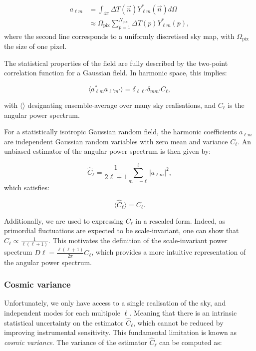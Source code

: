 \documentclass[../../thesis.tex]{subfiles}
\begin{document}
\begin{align}
    a_{\ell m} &= \int_{4\pi} \Delta T(\vec{n})Y_{\ell m}^{*}(\vec{n})d\Omega \\
    &\approx \Omega_{\mathrm{pix}} \sum_{p=1}^{N_{\mathrm{pix}}}\Delta T(p)Y_{\ell m}^{*}(p),
\end{align}
where the second line corresponds to a uniformly discretised sky map, with $\Omega_{\mathrm{pix}}$ the size of one pixel.

The statistical properties of the field are fully described by the two-point correlation function for a Gaussian field. In harmonic space, this implies:

\begin{equation}
    \langle a_{\ell m}^{*}a_{\ell\prime m\prime} \rangle = \delta_{\ell\ell\prime}\delta_{m m\prime}C_{\ell},
\end{equation}

with $\langle\rangle$ designating ensemble-average over many sky realisations, and $C_{\ell}$ is the angular power spectrum.

For a statistically isotropic Gaussian random field, the harmonic coefficients $a_{\ell m}$ are independent Gaussian random variables with zero mean and variance $C_{\ell}$. An unbiased estimator of the angular power spectrum is then given by:

\begin{equation}
    \hat{C}_{\ell} = \frac{1}{2\ell+1} \sum_{m=-\ell}^{\ell} |a_{\ell m}|^2,
\end{equation}
which satisfies:

\begin{equation}
    \langle \hat{C}_{\ell} \rangle = C_{\ell}.
\end{equation}

Additionally, we are used to expressing $C_\ell$ in a rescaled form. Indeed, as primordial fluctuations are expected to be scale-invariant, one can show that $C_\ell \propto \frac{1}{\ell(\ell + 1)}$. This motivates the definition of the scale-invariant power spectrum $D\ell = \frac{\ell(\ell + 1)}{2\pi}C_\ell$, which provides a more intuitive representation of the angular power spectrum.

\subsubsection{Cosmic variance} 

Unfortunately, we only have access to a single realisation of the sky, and independent modes for each multipole $\ell$. Meaning that there is an intrinsic statistical uncertainty on the estimator $\hat{C}_{\ell}$, which cannot be reduced by improving instrumental sensitivity. This fundamental limitation is known as \emph{cosmic variance}. The variance of the estimator $\hat{C}_{\ell}$ can be computed as:
\end{document}
